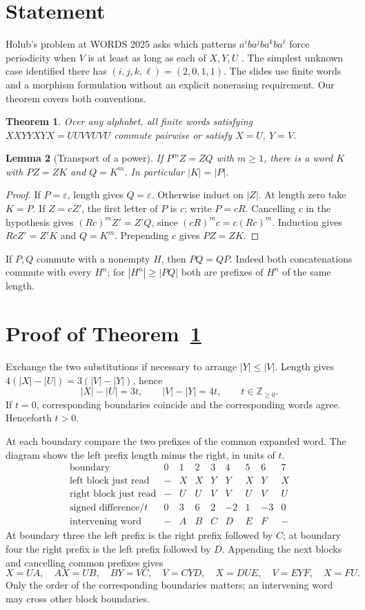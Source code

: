 \documentclass[10pt]{article}
\newtheorem{theorem}{Theorem}
\newtheorem{lemma}[theorem]{Lemma}
\newcommand{\eps}{\varepsilon}
\theoremstyle{remark}\newtheorem*{remark}{Remark}
\begin{document}
\section{Statement}
Holub's problem at WORDS 2025 asks which patterns \(a^i b a^j b a^k b a^\ell\) force periodicity when \(V\) is at least as long as each of \(X,Y,U\) \cite[pp.~3--5]{words}. The simplest unknown case identified there has \((i,j,k,\ell)=(2,0,1,1)\). The slides use finite words and a morphism formulation without an explicit nonerasing requirement. Our theorem covers both conventions.
\begin{theorem}\label{main}
Over any alphabet, all finite words satisfying \(XXYYXYX=UUVVUVU\) commute pairwise or satisfy \(X=U,\ Y=V\).
\end{theorem}
\begin{lemma}[Transport of a power]\label{transport}
If \(P^m Z=Z Q\) with \(m\ge1\), there is a word \(K\) with \(PZ=ZK\) and \(Q=K^m\). In particular \(|K|=|P|\).
\end{lemma}
\begin{proof}
If \(P=\eps\), length gives \(Q=\eps\). Otherwise induct on \(|Z|\). At length zero take \(K=P\). If \(Z=cZ'\), the first letter of \(P\) is \(c\); write \(P=cR\). Cancelling \(c\) in the hypothesis gives \((Rc)^m Z'=Z'Q\), since \((cR)^m c=c(Rc)^m\). Induction gives \(RcZ'=Z'K\) and \(Q=K^m\). Prepending \(c\) gives \(PZ=ZK\).
\end{proof}
If \(P,Q\) commute with a nonempty \(H\), then \(PQ=QP\). Indeed both concatenations commute with every \(H^n\); for \(|H^n|\ge |PQ|\) both are prefixes of \(H^n\) of the same length.

\section{Proof of Theorem~\ref{main}}
Exchange the two substitutions if necessary to arrange \(|Y|\le |V|\). Length gives \(4(|X|-|U|)=3(|V|-|Y|)\), hence
\[
 |X|-|U|=3t,\qquad |V|-|Y|=4t,\qquad t\in\mathbb Z_{\ge0}.
\]
If \(t=0\), corresponding boundaries coincide and the corresponding words agree. Henceforth \(t>0\).

At each boundary compare the two prefixes of the common expanded word. The diagram shows the left prefix length minus the right, in units of \(t\).
\[
\begin{array}{c|rrrrrrrr}
\text{boundary}&0&1&2&3&4&5&6&7\\ \hline
\text{left block just read}&-&X&X&Y&Y&X&Y&X\\
\text{right block just read}&-&U&U&V&V&U&V&U\\
\text{signed difference}/t&0&3&6&2&-2&1&-3&0\\
\text{intervening word}&-&A&B&C&D&E&F&-
\end{array}
\]
At boundary three the left prefix is the right prefix followed by \(C\); at boundary four the right prefix is the left prefix followed by \(D\). Appending the next blocks and cancelling common prefixes gives
\[
 X=UA,\quad AX=UB,\quad BY=VC,\quad V=CYD,\quad
 X=DUE,\quad V=EYF,\quad X=FU .
\]
Only the order of the corresponding boundaries matters; an intervening word may cross other block boundaries.
\end{document}
